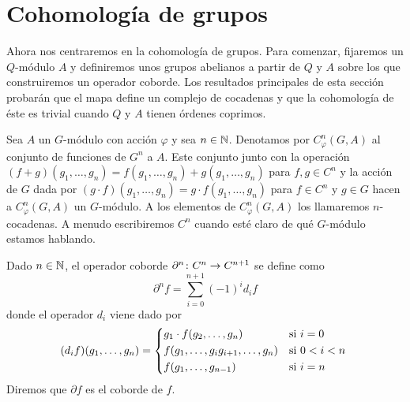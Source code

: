 \section{Cohomología de grupos}

Ahora nos centraremos en la cohomología de grupos. Para comenzar, fijaremos un $Q$-módulo $A$ y definiremos unos grupos abelianos a partir de $Q$ y $A$ sobre los que construiremos un operador coborde. Los resultados principales de esta sección probarán que el mapa define un complejo de cocadenas y que la cohomología de éste es trivial cuando $Q$ y $A$ tienen órdenes coprimos. 

\begin{definicion}
	Sea $A$ un $G$-módulo con acción $\varphi$ y sea $n\in \mathbb{N}$. Denotamos por $C^n_\varphi(G,A)$ al conjunto de funciones de $G^n$ a $A$. Este conjunto junto con la operación $(f+g)(g_1,\ldots,g_n) = f(g_1,\ldots,g_n) + g(g_1,\ldots,g_n)$ para $f,g\in C^n$ y la acción de $G$ dada por $(g\cdot f)(g_1,\ldots,g_n) = g\cdot f(g_1,\ldots,g_n)$ para $f\in C^n$ y $g\in G$ hacen a $C^n_\varphi(G,A)$ un $G$-módulo. %
	A los elementos de $C^n_\varphi(G,A)$ los llamaremos $n$-cocadenas. A menudo escribiremos $C^n$ cuando esté claro de qué $G$-módulo estamos hablando. %

\end{definicion}


\begin{definicion}
	Dado $n\in \mathbb{N}$, el operador coborde $\partial^n\colon C^n\to C^{n+1}$ se define como
	\begin{equation*}
		\partial^n f = \sum\limits_{i=0}^{n+1} (-1)^{i} d_i f
	\end{equation*}
	donde el operador $d_i$ viene dado por 
	\[
		(d_if)(g_1,\ldots,g_n) = 
		\begin{cases*} %
			g_1\cdot f(g_2,\ldots,g_n) 				& si $ i=0$ \\
			f(g_1,\ldots,g_ig_{i+1},\ldots,g_n) 	& si $ 0 < i <n$ \\ %
			f(g_1,\ldots,g_{n-1}) 					& si $ i=n$
		\end{cases*}
	\]
	Diremos que $\partial f$ es el coborde de $f$. %
\end{definicion}


